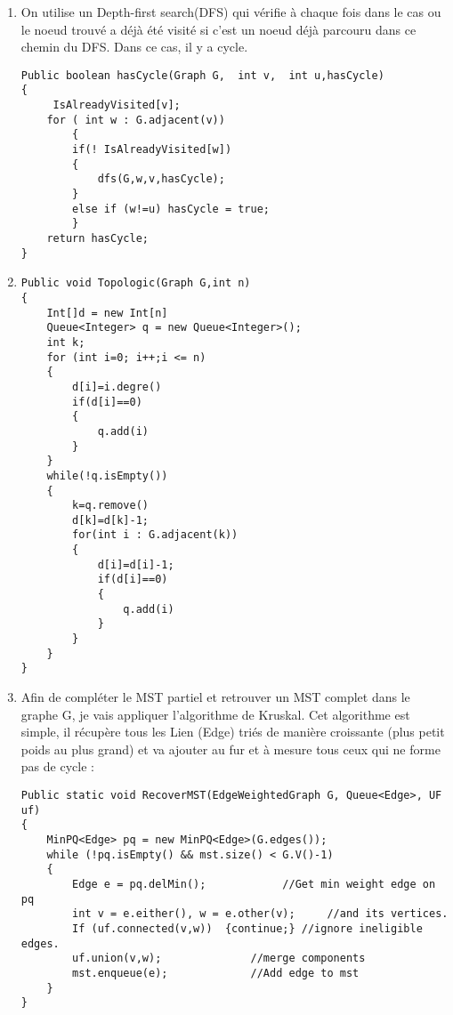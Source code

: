 \documentclass[11pt]{article}
\begin{document}
\begin{enumerate}
\begin{lstlisting}

Private void bfs(Graph G, int debut,int finish)
{
	Queue<Integer> q = new Queue<Integer>();
	IsAlreadyVisited[debut] = true;
	q.enqueue(debut)
	while(!q.isEmpty())
	{
	int v = q.dequeue();
	if ( v == finish)
		{
		break;
		}
	for (int w : G.adjacent(v))
		if(! IsAlreadyVisited[w])
		{
			path[w] = v ;
			 IsAlreadyVisited[w] = true;
			queue.enqueue(w);
		}
	}
}
\end{lstlisting} 

\item On utilise un Depth-first search(DFS) qui vérifie à chaque fois dans le cas ou le noeud trouvé a déjà été visité si c'est un noeud déjà parcouru dans ce chemin du DFS. Dans ce cas, il y a cycle.

\begin{lstlisting}
Public boolean hasCycle(Graph G,  int v,  int u,hasCycle)
{
	 IsAlreadyVisited[v];
	for ( int w : G.adjacent(v))
		{
		if(! IsAlreadyVisited[w])
		{
			dfs(G,w,v,hasCycle);
		}
		else if (w!=u) hasCycle = true;
		}
	return hasCycle;
}
\end{lstlisting} 

\item 
\begin{lstlisting}
Public void Topologic(Graph G,int n)
{
	Int[]d = new Int[n]
	Queue<Integer> q = new Queue<Integer>();
	int k;
	for (int i=0; i++;i <= n)
	{
		d[i]=i.degre()
		if(d[i]==0)
		{
			q.add(i)
		}
	}
	while(!q.isEmpty())
	{
		k=q.remove()
		d[k]=d[k]-1;
		for(int i : G.adjacent(k))
		{
			d[i]=d[i]-1;
			if(d[i]==0)
			{
				q.add(i)
			}
		}
	}
}

\end{lstlisting} 

\item Afin de compléter le MST partiel et retrouver un MST complet dans le graphe G, je vais appliquer l’algorithme de Kruskal. Cet algorithme est simple, il récupère tous les Lien (Edge) triés de manière croissante (plus petit poids au plus grand) et va ajouter au fur et à mesure tous ceux qui ne forme pas de cycle :
\\
\begin{lstlisting}
Public static void RecoverMST(EdgeWeightedGraph G, Queue<Edge>, UF uf)
{
	MinPQ<Edge> pq = new MinPQ<Edge>(G.edges());
	while (!pq.isEmpty() && mst.size() < G.V()-1)
	{
		Edge e = pq.delMin();   		 //Get min weight edge on pq
		int v = e.either(), w = e.other(v); 	//and its vertices.
		If (uf.connected(v,w))  {continue;}	//ignore ineligible edges.
		uf.union(v,w); 				//merge components 
		mst.enqueue(e);				//Add edge to mst
	}
}
\end{lstlisting} 


\end{enumerate}
\end{document}
